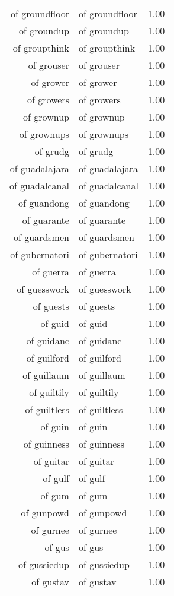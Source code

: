 \begin{table}[ht]
\begin{tabular}{rlr}
  of groundfloor & of groundfloor & 1.00 \\ 
  of groundup & of groundup & 1.00 \\ 
  of groupthink & of groupthink & 1.00 \\ 
  of grouser & of grouser & 1.00 \\ 
  of grower & of grower & 1.00 \\ 
  of growers & of growers & 1.00 \\ 
  of grownup & of grownup & 1.00 \\ 
  of grownups & of grownups & 1.00 \\ 
  of grudg & of grudg & 1.00 \\ 
  of guadalajara & of guadalajara & 1.00 \\ 
  of guadalcanal & of guadalcanal & 1.00 \\ 
  of guandong & of guandong & 1.00 \\ 
  of guarante & of guarante & 1.00 \\ 
  of guardsmen & of guardsmen & 1.00 \\ 
  of gubernatori & of gubernatori & 1.00 \\ 
  of guerra & of guerra & 1.00 \\ 
  of guesswork & of guesswork & 1.00 \\ 
  of guests & of guests & 1.00 \\ 
  of guid & of guid & 1.00 \\ 
  of guidanc & of guidanc & 1.00 \\ 
  of guilford & of guilford & 1.00 \\ 
  of guillaum & of guillaum & 1.00 \\ 
  of guiltily & of guiltily & 1.00 \\ 
  of guiltless & of guiltless & 1.00 \\ 
  of guin & of guin & 1.00 \\ 
  of guinness & of guinness & 1.00 \\ 
  of guitar & of guitar & 1.00 \\ 
  of gulf & of gulf & 1.00 \\ 
  of gum & of gum & 1.00 \\ 
  of gunpowd & of gunpowd & 1.00 \\ 
  of gurnee & of gurnee & 1.00 \\ 
  of gus & of gus & 1.00 \\ 
  of gussiedup & of gussiedup & 1.00 \\ 
  of gustav & of gustav & 1.00 \\ 

\end{tabular}
\end{table}
